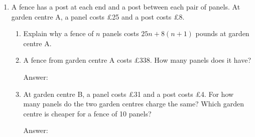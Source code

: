\documentclass[11pt,a4paper]{article}
\newcommand{\ansline}[1][2.2cm]{\underline{\hspace{#1}}}
\newcommand{\workspace}[1]{\par\vspace{#1}\hfill Answer: \ansline[3.5cm]\par}
\newcommand{\fence}[1]{%
  \foreach \k in {1,...,#1} {
    \pgfmathsetmacro{\xl}{(\k-1)*1.06+0.16}
    \draw[fill=yellow!6,line width=0.5pt] (\xl,0.12) rectangle (\xl+0.9,0.72);
    \foreach \s in {1,...,4} {\draw[gray!70] (\xl+0.18*\s,0.12) -- (\xl+0.18*\s,0.72);}}
  \pgfmathtruncatemacro{\posts}{#1}
  \foreach \k in {0,...,\posts} {\draw[fill=gray!40,line width=0.5pt] (\k*1.06,0) rectangle (\k*1.06+0.16,0.92);}}
\begin{document}
\begin{enumerate}[resume]
\item \begin{minipage}[t]{0.6\linewidth}
  A fence has a post at each end and a post between each pair of panels. At
  garden centre A, a panel costs \pounds25 and a post costs \pounds8.
  \end{minipage}\hfill
  \begin{minipage}[t]{0.37\linewidth}\raggedleft\vspace{0pt}
  \end{minipage}
  \begin{enumerate}
  \item Explain why a fence of $n$ panels costs $25n+8(n+1)$ pounds at garden centre A.
    \par\vspace{9pt}\hrulefill
  \item A fence from garden centre A costs \pounds338. How many panels does it have?
    \workspace{1.1cm}
  \item At garden centre B, a panel costs \pounds31 and a post costs \pounds4. For how
    many panels do the two garden centres charge the same? Which garden centre is
    cheaper for a fence of 10 panels?
    \workspace{1.4cm}
  \end{enumerate}


\end{enumerate}
\end{document}

